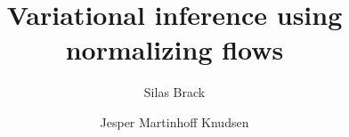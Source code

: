 \documentclass[11pt,a4paper]{amsart}
\title{Variational inference using normalizing flows}
\author{Silas Brack \and Jesper Martinhoff Knudsen}
\begin{document}
\maketitle






\nocite{*}
\printbibliography
\clearpage

\end{document}
